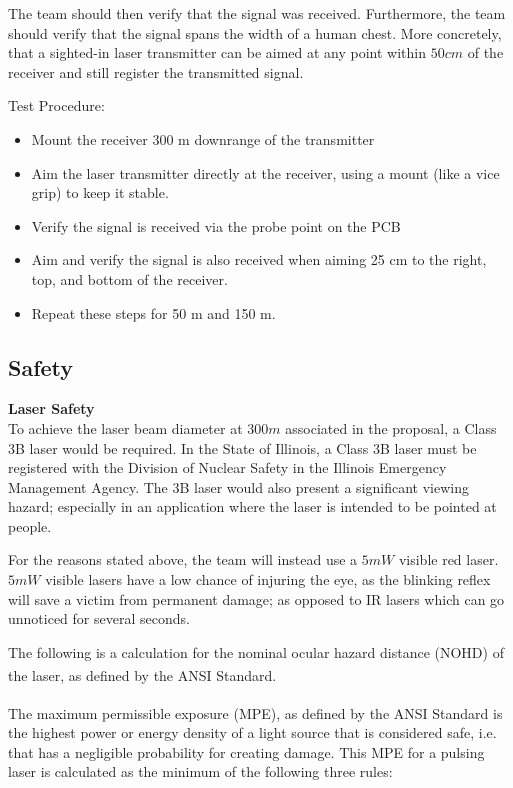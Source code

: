 \documentclass[letterpaper,10pt]{article}
\begin{document}
\begin{spacing}{1.15}
The team should then verify that the signal was received. Furthermore, the team should verify that the signal spans the width of a human chest. More concretely, that a sighted-in laser transmitter can be aimed at any point within $50 cm$ of the receiver and still register the transmitted signal. 

Test Procedure:

\begin{itemize}
	\item Mount the receiver 300 m downrange of the transmitter
	\item Aim the laser transmitter directly at the receiver, using a mount (like a vice grip) to keep it stable. 
	\item Verify the signal is received via the probe point on the PCB
	\item Aim and verify the signal is also received when aiming 25 cm to the right, top, and bottom of the receiver. 
	\item Repeat these steps for 50 m and 150 m. 
\end{itemize}



\subsection{Safety} \label{section-safety-ethics}
\normalsize\textbf{Laser Safety} \\
To achieve the laser beam diameter at $300 m$ associated in the proposal, a Class 3B laser would be required. In the State of Illinois, a Class 3B laser must be registered with the Division of Nuclear Safety in the Illinois Emergency Management Agency. The 3B laser would also present a significant viewing hazard; especially in an application where the laser is intended to be pointed at people. 

For the reasons stated above, the team will instead use a $5mW$ visible red laser. $5mW$ visible lasers have a low chance of injuring the eye, as the blinking reflex will save a victim from permanent damage; as opposed to IR lasers which can go unnoticed for several seconds. 

The following is a calculation for the nominal ocular hazard distance (NOHD) of the laser, as defined by the ANSI Standard\textsuperscript{\cite{ANSI}}.

The maximum permissible exposure (MPE), as defined by the ANSI Standard \textsuperscript{\cite{ANSI}} is the highest power or energy density of a light source that is considered safe, i.e. that has a negligible probability for creating damage. This MPE for a pulsing laser is calculated as the minimum of the following three rules:


\end{spacing}
\end{document}
